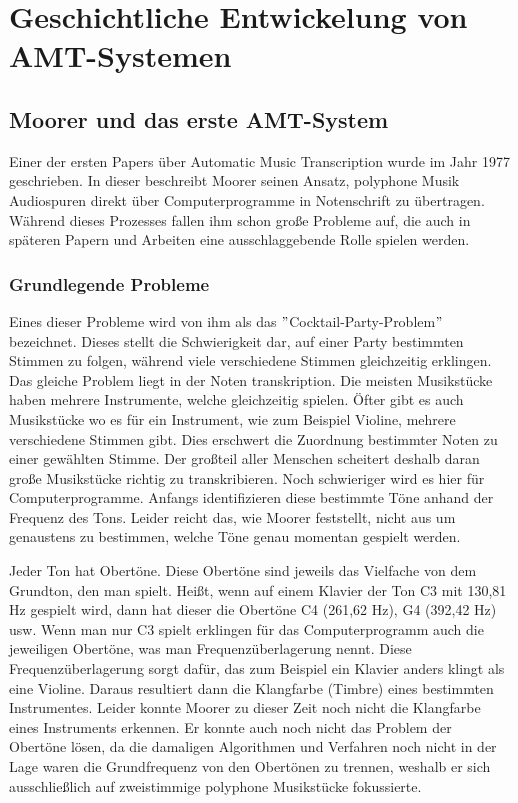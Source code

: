 \usepackage{hyperref}\section{Geschichtliche Entwickelung von AMT-Systemen}

\subsection{Moorer und das erste AMT-System}
Einer der ersten Papers über Automatic Music Transcription wurde im Jahr 1977 geschrieben.
\cite{Moorer1977}
In dieser beschreibt Moorer seinen Ansatz, polyphone Musik Audiospuren
direkt über Computerprogramme in Notenschrift zu übertragen.
Während dieses Prozesses fallen ihm schon große Probleme auf, die auch in späteren Papern und Arbeiten
eine ausschlaggebende Rolle spielen werden.

\subsubsection{Grundlegende Probleme}
Eines dieser Probleme wird von ihm als das \("\)Cocktail-Party-Problem\("\) bezeichnet.
Dieses stellt die Schwierigkeit dar, auf einer Party bestimmten Stimmen zu folgen, während viele verschiedene Stimmen
gleichzeitig erklingen.
Das gleiche Problem liegt in der Noten transkription.
Die meisten Musikstücke haben mehrere Instrumente, welche gleichzeitig spielen.
Öfter gibt es auch Musikstücke wo es für ein Instrument, wie zum Beispiel Violine, mehrere verschiedene Stimmen gibt.
Dies erschwert die Zuordnung bestimmter Noten zu einer gewählten Stimme.
Der großteil aller Menschen scheitert deshalb daran große Musikstücke richtig zu transkribieren.
Noch schwieriger wird es hier für Computerprogramme.
Anfangs identifizieren diese bestimmte Töne anhand der Frequenz des Tons.
Leider reicht das, wie Moorer feststellt, nicht aus um genaustens zu bestimmen,
welche Töne genau momentan gespielt werden.

Jeder Ton hat Obertöne.
Diese Obertöne sind jeweils das Vielfache von dem Grundton, den man spielt.
Heißt, wenn auf einem Klavier der Ton C3 mit 130,81 Hz gespielt wird, dann hat dieser
die Obertöne C4 (261,62 Hz), G4 (392,42 Hz) usw.
Wenn man nur C3 spielt erklingen für das Computerprogramm auch die jeweiligen Obertöne,
was man Frequenzüberlagerung nennt.
Diese Frequenzüberlagerung sorgt dafür, das zum Beispiel ein Klavier anders klingt als eine Violine.
Daraus resultiert dann die Klangfarbe (Timbre) eines bestimmten Instrumentes.
\cite{goswami2013timbre}
Leider konnte Moorer zu dieser Zeit noch nicht die Klangfarbe eines Instruments erkennen.
Er konnte auch noch nicht das Problem der Obertöne lösen,
da die damaligen Algorithmen und Verfahren noch nicht in der Lage waren die Grundfrequenz von den Obertönen zu trennen,
weshalb er sich ausschließlich auf zweistimmige polyphone Musikstücke fokussierte.

